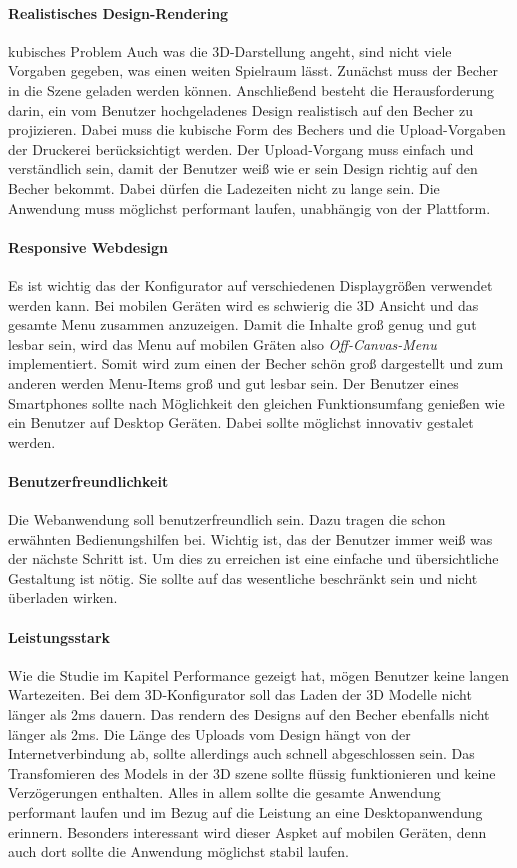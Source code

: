 \paragraph{Realistisches Design-Rendering}
kubisches Problem
Auch was die 3D-Darstellung angeht, sind nicht viele Vorgaben gegeben, was einen weiten Spielraum lässt. Zunächst muss der Becher in die Szene geladen werden können. Anschließend besteht die Herausforderung darin, ein vom Benutzer hochgeladenes Design realistisch auf den Becher zu projizieren. Dabei muss die kubische Form des Bechers und die Upload-Vorgaben der Druckerei berücksichtigt werden. Der Upload-Vorgang muss einfach und verständlich sein, damit der Benutzer weiß wie er sein Design richtig auf den Becher bekommt. Dabei dürfen die Ladezeiten nicht zu lange sein. Die Anwendung muss möglichst performant laufen, unabhängig von der Plattform.
%
\paragraph{Responsive Webdesign}
Es ist wichtig das der Konfigurator auf verschiedenen Displaygrößen verwendet werden kann. Bei mobilen Geräten wird es schwierig die 3D Ansicht und das gesamte Menu zusammen anzuzeigen. Damit die Inhalte groß genug und gut lesbar sein, wird das Menu auf mobilen Gräten also \textit{Off-Canvas-Menu} implementiert. Somit wird zum einen der Becher schön groß dargestellt und zum anderen werden Menu-Items groß und gut lesbar sein. Der Benutzer eines Smartphones sollte nach Möglichkeit den gleichen Funktionsumfang genießen wie ein Benutzer auf Desktop Geräten. Dabei sollte möglichst innovativ gestalet werden.
%
\paragraph{Benutzerfreundlichkeit}
Die Webanwendung soll benutzerfreundlich sein. Dazu tragen die schon erwähnten Bedienungshilfen bei. Wichtig ist, das der Benutzer immer weiß was der nächste Schritt ist. Um dies zu erreichen ist eine einfache und übersichtliche Gestaltung ist nötig. Sie sollte auf das wesentliche beschränkt sein und nicht überladen wirken.
%
\paragraph{Leistungsstark}
Wie die Studie im Kapitel Performance gezeigt hat, mögen Benutzer keine langen Wartezeiten. Bei dem 3D-Konfigurator soll das Laden der 3D Modelle nicht länger als 2ms dauern. Das rendern des Designs auf den Becher ebenfalls nicht länger als 2ms. Die Länge des Uploads vom Design hängt von der Internetverbindung ab, sollte allerdings auch schnell abgeschlossen sein. Das Transfomieren des Models in der 3D szene sollte flüssig funktionieren und keine Verzögerungen enthalten. Alles in allem sollte die gesamte Anwendung performant laufen und im Bezug auf die Leistung an eine Desktopanwendung erinnern. Besonders interessant wird dieser Aspket auf mobilen Geräten, denn auch dort sollte die Anwendung möglichst stabil laufen.
%
%
%
%
%
